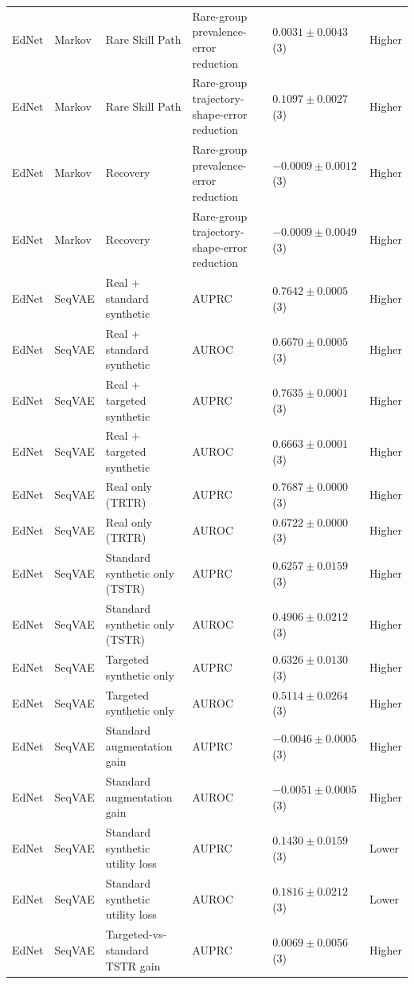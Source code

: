 \begin{longtable}{@{}p{2.25cm}p{2.05cm}p{4.7cm}p{5.0cm}p{2.6cm}p{1.25cm}@{}}
EdNet & Markov & Rare Skill Path & Rare-group prevalence-error reduction & $0.0031 \mathbin{\pm} 0.0043$ (3) & Higher \\
EdNet & Markov & Rare Skill Path & Rare-group trajectory-shape-error reduction & $0.1097 \mathbin{\pm} 0.0027$ (3) & Higher \\
EdNet & Markov & Recovery & Rare-group prevalence-error reduction & $-0.0009 \mathbin{\pm} 0.0012$ (3) & Higher \\
EdNet & Markov & Recovery & Rare-group trajectory-shape-error reduction & $-0.0009 \mathbin{\pm} 0.0049$ (3) & Higher \\
EdNet & SeqVAE & Real + standard synthetic & AUPRC & $0.7642 \mathbin{\pm} 0.0005$ (3) & Higher \\
EdNet & SeqVAE & Real + standard synthetic & AUROC & $0.6670 \mathbin{\pm} 0.0005$ (3) & Higher \\
EdNet & SeqVAE & Real + targeted synthetic & AUPRC & $0.7635 \mathbin{\pm} 0.0001$ (3) & Higher \\
EdNet & SeqVAE & Real + targeted synthetic & AUROC & $0.6663 \mathbin{\pm} 0.0001$ (3) & Higher \\
EdNet & SeqVAE & Real only (TRTR) & AUPRC & $0.7687 \mathbin{\pm} 0.0000$ (3) & Higher \\
EdNet & SeqVAE & Real only (TRTR) & AUROC & $0.6722 \mathbin{\pm} 0.0000$ (3) & Higher \\
EdNet & SeqVAE & Standard synthetic only (TSTR) & AUPRC & $0.6257 \mathbin{\pm} 0.0159$ (3) & Higher \\
EdNet & SeqVAE & Standard synthetic only (TSTR) & AUROC & $0.4906 \mathbin{\pm} 0.0212$ (3) & Higher \\
EdNet & SeqVAE & Targeted synthetic only & AUPRC & $0.6326 \mathbin{\pm} 0.0130$ (3) & Higher \\
EdNet & SeqVAE & Targeted synthetic only & AUROC & $0.5114 \mathbin{\pm} 0.0264$ (3) & Higher \\
EdNet & SeqVAE & Standard augmentation gain & AUPRC & $-0.0046 \mathbin{\pm} 0.0005$ (3) & Higher \\
EdNet & SeqVAE & Standard augmentation gain & AUROC & $-0.0051 \mathbin{\pm} 0.0005$ (3) & Higher \\
EdNet & SeqVAE & Standard synthetic utility loss & AUPRC & $0.1430 \mathbin{\pm} 0.0159$ (3) & Lower \\
EdNet & SeqVAE & Standard synthetic utility loss & AUROC & $0.1816 \mathbin{\pm} 0.0212$ (3) & Lower \\
EdNet & SeqVAE & Targeted-vs-standard TSTR gain & AUPRC & $0.0069 \mathbin{\pm} 0.0056$ (3) & Higher \\

\end{longtable}
